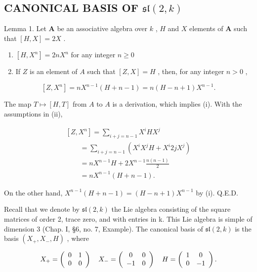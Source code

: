 \subsection{\texorpdfstring{CANONICAL BASIS OF \(\mathfrak{sl}(2,k)\)}{CANONICAL BASIS OF \textbackslash mathfrak\{sl\}(2,k)}}

Lemma 1. Let \(\mathbf{A}\) be an associative algebra over \(k\) , \(H\) and \(X\) elements of \(\mathbf{A}\) such that \([H, X] = 2X\) .

\begin{enumerate}
\def\labelenumi{(\roman{enumi})}
\item
  \([H,X^n ] = 2nX^n\) for any integer \(n\geq 0\)
\item
  If \(Z\) is an element of \(A\) such that \([Z, X] = H\) , then, for any integer \(n > 0\) ,
\end{enumerate}

\[
[ Z, X ^ {n} ] = n X ^ {n - 1} (H + n - 1) = n (H - n + 1) X ^ {n - 1}.
\]

The map \(T \mapsto [H, T]\) from \(A\) to \(A\) is a derivation, which implies (i). With the assumptions in (ii),

\[
\begin{array}{l} [ Z, X ^ {n} ] = \sum_ {i + j = n - 1} X ^ {i} H X ^ {j} \\ \qquad = \sum_ {i + j = n - 1} (X ^ {i} X ^ {j} H + X ^ {i} 2 j X ^ {j}) \\ \qquad = n X ^ {n - 1} H + 2 X ^ {n - 1} \frac {n (n - 1)}{2} \\ \qquad = n X ^ {n - 1} (H + n - 1). \end{array}
\]

On the other hand, \(X^{n-1}(H+n-1)=(H-n+1)X^{n-1}\) by (i). Q.E.D.

Recall that we denote by \(\mathfrak{sl}(2,k)\) the Lie algebra consisting of the square matrices of order 2, trace zero, and with entries in k. This Lie algebra is simple of dimension 3 (Chap. I, §6, no. 7, Example). The canonical basis of \(\mathfrak{sl}(2,k)\) is the basis \((X_{+},X_{-},H)\) , where

\[
X _ {+} = \left( \begin{array}{c c} 0 & 1 \\ 0 & 0 \end{array} \right) \quad X _ {-} = \left( \begin{array}{c c} 0 & 0 \\ - 1 & 0 \end{array} \right) \quad H = \left( \begin{array}{c c} 1 & 0 \\ 0 & - 1 \end{array} \right).
\]

